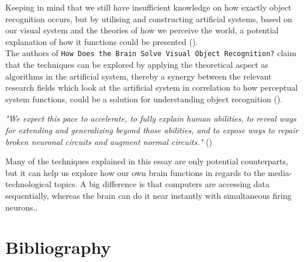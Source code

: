 \documentclass{article}
\newcommand{\goodcite}[1]{ {(\cite{#1})}}
\begin{document}
Keeping in mind that we still have insufficient knowledge on how exactly object recognition occurs, but by utilising and constructing artificial systems, based on our visual system and the theories of how we perceive the world, a potential explanation of how it functions could be presented\goodcite{solveVisual}.\\
The authors of \texttt{How Does the Brain Solve Visual Object Recognition?} claim that the techniques can be explored by applying the theoretical aspect as algorithms in the artificial system, thereby a synergy between the relevant research fields which look at the artificial system in correlation to how perceptual system functions, could be a solution for understanding object recognition\goodcite{solveVisual}.\\
\begin{center}
    \textit{"We expect this pace to accelerate, to fully explain human abilities, to reveal ways for extending and generalizing beyond those abilities, and to expose ways to repair broken neuronal circuits and augment normal circuits."}\goodcite{solveVisual}\medskip \\
\end{center}
Many of the techniques explained in this essay are only potential counterparts, but it can help us explore how our own brain functions in regards to the media-technological topics. A big difference is that computers are accessing data sequentially, whereas the brain can do it near instantly with simultaneous firing neurons..


\newpage
\section{Bibliography}
\label{sec:Bibliography}
\printbibliography
\end{document}
